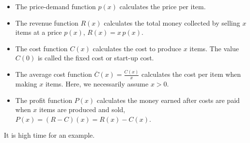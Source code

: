 \documentclass{ximera}
\begin{document}
\begin{itemize}

\item  The price-demand function $p(x)$ calculates the price per item.

\item  The revenue function $R(x)$ calculates the total money collected by selling $x$ items at a price $p(x)$,  $R(x) = x \, p(x)$.

\item  The cost function $C(x)$  calculates the cost to produce $x$ items.  The value $C(0)$ is called the fixed cost or start-up cost.

\item  The average cost function $\overline{C}(x) = \frac{C(x)}{x}$ calculates the cost per item when making $x$ items.  Here, we necessarily assume $x > 0$.

\item  The profit function $P(x)$ calculates the money earned after costs are paid when $x$ items are produced and sold, $P(x) = (R-C)(x) = R(x) - C(x)$.

\end{itemize}


It is high time for an example.

\end{document}
